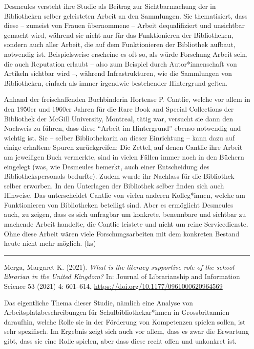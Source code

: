 \documentclass[a4paper,
fontsize=11pt,
oneside,
numbers=noperiodatend,
parskip=half-,
bibliography=totoc,
final
]{scrartcl}
\begin{document}
Desmeules versteht ihre Studie als Beitrag zur Sichtbarmachung der in
Bibliotheken selber geleisteten Arbeit an den Sammlungen. Sie
thematisiert, dass diese -- zumeist von Frauen übernommene -- Arbeit
dequalifiziert und unsichtbar gemacht wird, während sie nicht nur für
das Funktionieren der Bibliotheken, sondern auch aller Arbeit, die auf
dem Funktionieren der Bibliothek aufbaut, notwendig ist. Beispielsweise
erscheine es oft so, als würde Forschung Arbeit sein, die auch
Reputation erlaubt -- also zum Beispiel durch Autor*innenschaft von
Artikeln sichtbar wird --, während Infrastrukturen, wie die Sammlungen
von Bibliotheken, einfach als immer irgendwie bestehender Hintergrund
gelten.

Anhand der freischaffenden Buchbinderin Hortense P. Cantlie, welche vor
allem in den 1950er und 1960er Jahren für die Rare Book and Special
Collections der Bibliothek der McGill University, Montreal, tätig war,
versucht sie dann den Nachweis zu führen, dass diese \enquote{Arbeit im
Hintergrund} ebenso notwendig und wichtig ist. Sie -- selber
Bibliothekarin an dieser Einrichtung -- kann dazu auf einige erhaltene
Spuren zurückgreifen: Die Zettel, auf denen Cantlie ihre Arbeit am
jeweiligen Buch vermerkte, sind in vielen Fällen immer noch in den
Büchern eingelegt (was, wie Desmeules bemerkt, auch einer Entscheidung
des Bibliothekspersonals bedurfte). Zudem wurde ihr Nachlass für die
Bibliothek selber erworben. In den Unterlagen der Bibliothek selber
finden sich auch Hinweise. Das unterscheidet Cantlie von vielen anderen
Kolleg*innen, welche am Funktionieren von Bibliotheken beteiligt sind.
Aber es ermöglicht Desmeules auch, zu zeigen, dass es sich unfragbar um
konkrete, benennbare und sichtbar zu machende Arbeit handelte, die
Cantlie leistete und nicht um reine Servicedienste. Ohne diese Arbeit
wären viele Forschungsarbeiten mit dem konkreten Bestand heute nicht
mehr möglich. (ks)

\begin{center}\rule{0.5\linewidth}{0.5pt}\end{center}

Merga, Margaret K. (2021). \emph{What is the literacy supportive role of
the school librarian in the United Kingdom?} In: Journal of
Librarianship and Information Science 53 (2021) 4: 601--614,
\url{https://doi.org/10.1177/0961000620964569}

Das eigentliche Thema dieser Studie, nämlich eine Analyse von
Arbeitsplatzbeschreibungen für Schulbibliothekar*innen in
Grossbritannien daraufhin, welche Rolle sie in der Förderung von
Kompetenzen spielen sollen, ist sehr spezifisch. Im Ergebnis zeigt sich
auch vor allem, dass es zwar die Erwartung gibt, dass sie eine Rolle
spielen, aber dass diese recht offen und unkonkret ist.
\end{document}
